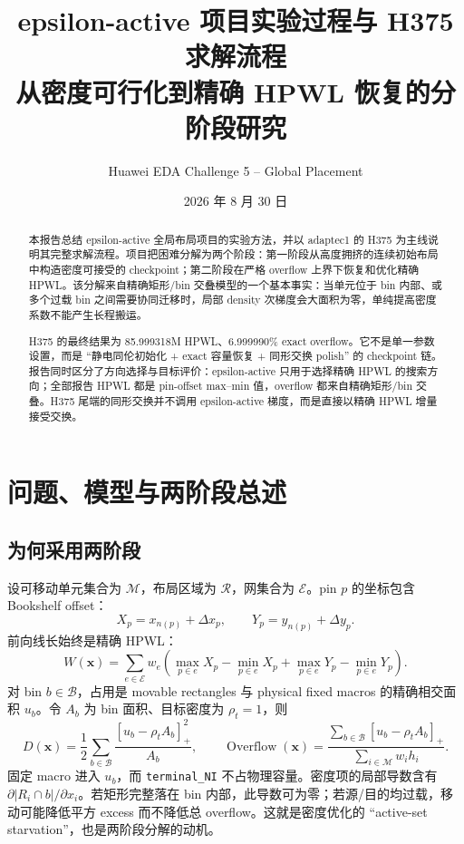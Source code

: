 \documentclass[UTF8,a4paper,11pt]{ctexrep}
\title{epsilon-active 项目实验过程与 H375 求解流程\\
\large 从密度可行化到精确 HPWL 恢复的分阶段研究}
\author{Huawei EDA Challenge 5 -- Global Placement}
\date{2026 年 8 月 30 日}
\newcommand{\Overflow}{\operatorname{Overflow}}
\newcommand{\Mcal}{\mathcal{M}}
\newcommand{\Bcal}{\mathcal{B}}
\newcommand{\Rcal}{\mathcal{R}}
\begin{document}
\maketitle
\begin{abstract}
本报告总结 epsilon-active 全局布局项目的实验方法，并以 adaptec1 的 H375 为主线说明其完整求解流程。项目把困难分解为两个阶段：第一阶段从高度拥挤的连续初始布局中构造密度可接受的 checkpoint；第二阶段在严格 overflow 上界下恢复和优化精确 HPWL。该分解来自精确矩形/bin 交叠模型的一个基本事实：当单元位于 bin 内部、或多个过载 bin 之间需要协同迁移时，局部 density 次梯度会大面积为零，单纯提高密度系数不能产生长程搬运。

H375 的最终结果为 85.999318M HPWL、6.999990\% exact overflow。它不是单一参数设置，而是 ``静电同伦初始化 + exact 容量恢复 + 同形交换 polish'' 的 checkpoint 链。报告同时区分了方向选择与目标评价：epsilon-active 只用于选择精确 HPWL 的搜索方向；全部报告 HPWL 都是 pin-offset max--min 值，overflow 都来自精确矩形/bin 交叠。H375 尾端的同形交换并不调用 epsilon-active 梯度，而是直接以精确 HPWL 增量接受交换。
\end{abstract}
\tableofcontents

\chapter{问题、模型与两阶段总述}
\section{为何采用两阶段}
设可移动单元集合为 $\Mcal$，布局区域为 $\Rcal$，网集合为 $\mathcal{E}$。pin $p$ 的坐标包含 Bookshelf offset：
\[
 X_p=x_{n(p)}+\Delta x_p,\qquad Y_p=y_{n(p)}+\Delta y_p.
\]
前向线长始终是精确 HPWL：
\begin{equation}
 W(\bm{x})=\sum_{e\in\mathcal E}w_e\left(\max_{p\in e}X_p-\min_{p\in e}X_p+
 \max_{p\in e}Y_p-\min_{p\in e}Y_p\right).\label{eq:hpwl}
\end{equation}
对 bin $b\in\Bcal$，占用是 movable rectangles 与 physical fixed macros 的精确相交面积 $u_b$。令 $A_b$ 为 bin 面积、目标密度为 $\rho_t=1$，则
\begin{equation}
 D(\bm{x})=\frac12\sum_{b\in\Bcal}\frac{[u_b-\rho_tA_b]_+^2}{A_b},\qquad
 \Overflow(\bm{x})=\frac{\sum_{b\in\Bcal}[u_b-\rho_tA_b]_+}{\sum_{i\in\Mcal}w_ih_i}.\label{eq:density}
\end{equation}
固定 macro 进入 $u_b$，而 \texttt{terminal\_NI} 不占物理容量。密度项的局部导数含有 $\partial |R_i\cap b|/\partial x_i$。若矩形完整落在 bin 内部，此导数可为零；若源/目的均过载，移动可能降低平方 excess 而不降低总 overflow。这就是密度优化的 ``active-set starvation''，也是两阶段分解的动机。
\end{document}
